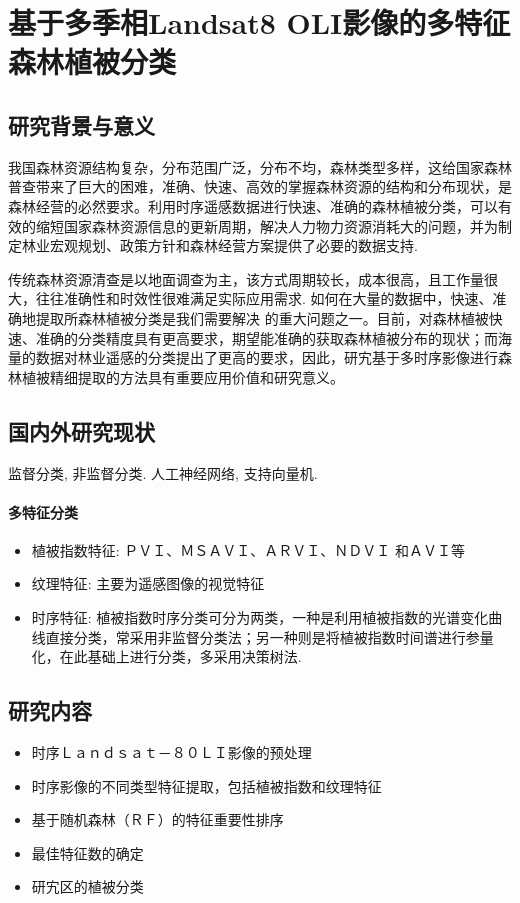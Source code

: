 \section{基于多季相Landsat8 OLI影像的多特征森林植被分类}

\subsection{研究背景与意义}
我国森林资源结构复杂，分布范围广泛，分布不均，森林类型多样，这给国家森林普查带来了巨大的困难，准确、快速、高效的掌握森林资源的结构和分布现状，是森林经营的必然要求。利用时序遥感数据进行快速、准确的森林植被分类，可以有效的缩短国家森林资源信息的更新周期，解决人力物力资源消耗大的问题，并为制定林业宏观规划、政策方针和森林经营方案提供了必要的数据支持.

传统森林资源清查是以地面调查为主，该方式周期较长，成本很高，且工作量很大，往往准确性和时效性很难满足实际应用需求. 如何在大量的数据中，快速、准确地提取所森林植被分类是我们需要解决
的重大问题之一。目前，对森林植被快速、准确的分类精度具有更高要求，期望能准确的获取森林植被分布的现状；而海量的数据对林业遥感的分类提出了更高的要求，因此，研宄基于多时序影像进行森林植被精细提取的方法具有重要应用价值和研究意义。

\subsection{国内外研究现状}
监督分类, 非监督分类. 人工神经网络, 支持向量机.

\paragraph*{多特征分类}
\begin{itemize}
    \item 植被指数特征: ＰＶＩ、ＭＳＡＶＩ、ＡＲＶＩ、ＮＤＶＩ
    和ＡＶＩ等
    \item 纹理特征: 主要为遥感图像的视觉特征
    \item 时序特征: 植被指数时序分类可分为两类，一种是利用植被指数的光谱变化曲线直接分类，常采用非监督分类法；另一种则是将植被指数时间谱进行参量化，在此基础上进行分类，多采用决策树法.
\end{itemize}

\subsection{研究内容}
\begin{itemize}
    \item 时序Ｌａｎｄｓａｔ－８０ＬＩ影像的预处理
    \item 时序影像的不同类型特征提取，包括植被指数和纹理特征
    \item 基于随机森林（ＲＦ）的特征重要性排序
    \item 最佳特征数的确定
    \item 研宄区的植被分类
\end{itemize}




